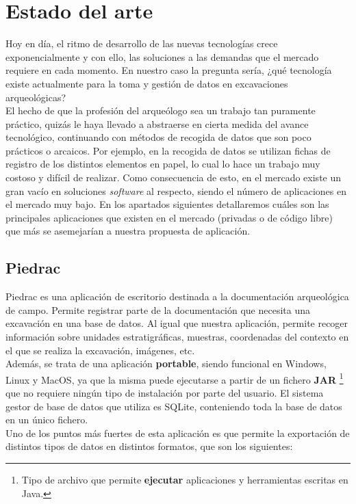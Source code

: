 \chapter{Estado del arte}
Hoy en día, el ritmo de desarrollo de las nuevas tecnologías crece exponencialmente y con
ello, las soluciones a las demandas que el mercado requiere en cada momento. En nuestro
caso la pregunta sería, ¿qué tecnología existe actualmente para la toma y gestión de datos
en excavaciones arqueológicas?\\

El hecho de que la profesión del arqueólogo sea un trabajo tan puramente práctico, quizás
le haya llevado a abstraerse en cierta medida del avance tecnológico, continuando con
métodos de recogida de datos que son poco prácticos o arcaicos. Por ejemplo, en la recogida
de datos se utilizan fichas de registro de los distintos elementos en papel, lo cual lo
hace un trabajo muy costoso y difícil de realizar. Como consecuencia de esto, en el mercado
existe un gran vacío en soluciones \textit{software} al respecto, siendo el número de
aplicaciones en el mercado muy bajo. En los apartados siguientes detallaremos cuáles son las
principales aplicaciones que existen en el mercado (privadas o de código libre)
que más se asemejarían a nuestra propuesta de aplicación.\\

\section{Piedrac}
Piedrac \cite{piedrac} es una aplicación de escritorio destinada a la documentación
arqueológica de campo. Permite registrar parte de la documentación que necesita una
excavación en una base de datos. Al igual que nuestra aplicación, permite recoger
información sobre unidades estratigráficas, muestras, coordenadas del contexto en el que
se realiza la excavación, imágenes, etc.\\

Además, se trata de una aplicación \textbf{portable}, siendo funcional en Windows, Linux
y MacOS, ya que la misma puede ejecutarse a partir de  un fichero \textbf{JAR}
\footnote{Tipo de archivo que permite \textbf{ejecutar} aplicaciones y herramientas escritas
en Java.} que no requiere ningún tipo de instalación por parte del usuario. El sistema
gestor de base de datos que utiliza es SQLite, conteniendo toda la base de datos en un
único fichero.\\

Uno de los puntos más fuertes de esta aplicación es que permite la exportación de distintos
tipos de datos en distintos formatos, que son los siguientes:

